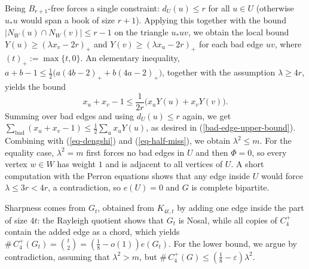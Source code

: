 \documentclass[11pt,a4paper]{article}
\theoremstyle{definition}
\theoremstyle{plain}
\renewcommand{\le}{\leqslant}
\renewcommand{\ge}{\geqslant}
\begin{document}
\smallskip
\noindent
{}
Being $B_{r+1}$-free forces a single constraint:  $d_U(u)\le r$ for all $u\in U$
(otherwise $u_*u$ would span a book of size $r+1$). Applying this together with the bound
$|N_W(u)\cap N_W(v)|\le r-1$ on the triangle $u_*uv$, we obtain the local 
bound $Y(u)\ge(\lambda x_v-2r)_+$ and 
$ Y(v)\ge (\lambda x_u -2r)_+$ for each bad edge $uv$, where  $(t)_+:=\max\{t,0\}$. 
An elementary inequality, 
$a+b-1\le\tfrac12\bigl(a(4b-2)_++b(4a-2)_+\bigr)$, together with the assumption $\lambda\ge 4r$,  yields the  bound
$$ x_u+x_v-1\le\frac1{2r}\bigl(x_uY(u)+x_vY(v)\bigr). $$  Summing over bad edges and
using $d_U (u)\le r$ again, we get 
$\sum_{\text{bad}} (x_u+x_v -1) \le  \tfrac12\sum_{u}x_uY(u)$, as desired in (\ref{bad-edge-upper-bound}). Combining with (\ref{eq-dengshi}) and (\ref{eq-half-miss}), 
we obtain $\lambda ^2\le m$. For the equality case, $\lambda^2=m$ first forces no bad edges in $U$ and then $\Phi=0$, so every vertex $w\in W$ has weight $1$ and
is adjacent to all vertices of $U$. A short computation with the Perron equations shows that any
edge inside $U$ would force $\lambda\le 3r<4r$, a contradiction, so $e(U)=0$ and
$G$ is complete bipartite.

\smallskip
\noindent
{}
Sharpness comes from $G_t$, obtained from $K_{4t,t}$ by adding one
edge inside the part of size $4t$: the Rayleigh quotient shows that $G_t$ is Nosal, while all copies of $C_4^+$ contain the added edge as a chord, which yields 
$\texttt{\#}\,C_4^+(G_t)=\binom t2=(\tfrac18-o(1))e(G_t)$. For the lower bound, we argue by
contradiction, assuming that $\lambda^2>m$, but 
$\texttt{\#}\, C_4^+(G)\le(\tfrac18-\varepsilon)\lambda^2$. 
\end{document}
